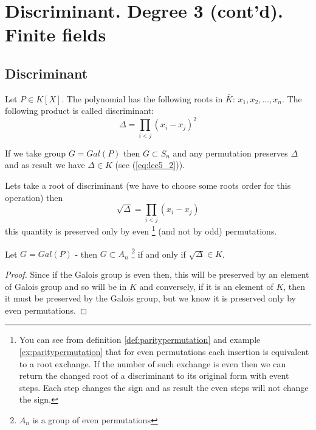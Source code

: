 \section{Discriminant. Degree 3 (cont'd). Finite fields}

\subsection{Discriminant}

\begin{definition}[discriminant]
  Let $P \in K\left[X\right]$. The polynomial has the following roots
  in $\bar{K}$: $x_1, x_2, \dots, x_n$. The following product is
  called discriminant:
  \[
  \Delta = \prod_{i < j} \left(x_i - x_j\right)^2
  \]
  \label{def:discriminant}
\end{definition}

If we take group $G = Gal\left(P\right)$ then
$G \subset S_n$ and any permutation preserves $\Delta$ and as result
we have $\Delta \in K$ (see (\ref{eq:lec5_2})).

Lets take a root of discriminant (we have to choose some roots order
for this operation) then
\[
\sqrt{\Delta} = \prod_{i < j} \left(x_i - x_j\right)
\]
this quantity is preserved only by even
\footnote{
  You can see from definition \ref{def:paritypermutation} and example
  \ref{ex:paritypermutation} that for even permutations each insertion
  is equivalent to a root exchange. If the number of such exchange is
  even then we can return the changed root of a discriminant to its original
  form with event steps. Each step changes the sign and as result the
  even steps will not change the sign.
}
(and not by odd) permutations.

\begin{proposition}
  Let $G = Gal\left(P\right)$ -  then $G
  \subset A_n$
  \footnote {
    $A_n$ is a group of even permutations
  }
  if and only if $\sqrt{\Delta} \in K$.
  \begin{proof}
    Since if the Galois group is even then, this will be preserved by
    an element of Galois group and so will be in $K$ and conversely, if
    it is an element of $K$, then it must be preserved by the Galois
    group, but we know it is preserved only by even permutations. 
  \end{proof}
  \label{prop:lec6_1}
\end{proposition}

